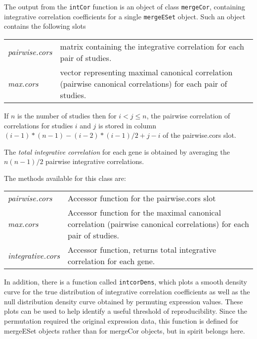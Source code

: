 \documentclass[12pt]{article}
\begin{document}
\begin{description}
The output from the \verb+intCor+ function is an object of class
\verb+mergeCor+, containing integrative correlation coefficients for
a single \verb+mergeESet+ object.   Such an object contains the
following slots

\begin{center}
  \begin{tabular}{|lp{5in}|}
    \hline
    {\it pairwise.cors} & matrix containing the integrative correlation
for each pair of studies. \\
    {\it max.cors} & vector representing maximal canonical correlation (pairwise canonical correlations) for each pair of studies.\\\hline
  \end{tabular}
\end{center}

 If $n$ is the number of studies
 then for $i < j \leq n$, the pairwise correlation of correlations for studies $i$ and $j$ is stored in column $(i-1)*(n-1)-(i-2)*(i-1)/2 + j-i$ of the pairwise.cors slot.

The {\it total integrative correlation} for each gene is obtained by
averaging the $n(n-1)/2$ pairwise integrative correlations.

The methods available for this class are:
\begin{center}
  \begin{tabular}{|lp{5in}|}
    \hline
{\it pairwise.cors} &Accessor function for the pairwise.cors slot \\
{\it max.cors} &Accessor function for the maximal canonical correlation (pairwise canonical correlations) for each pair of studies. \\
{\it integrative.cors} &Accessor function, returns total integrative
correlation  for each gene. \\ \hline

 \end{tabular}
\end{center}

In addition, there is a function called \verb+intcorDens+, which
plots a smooth density curve for the true distribution of
integrative correlation coefficients as well as the null
distribution density curve obtained by permuting expression values.
These plots can be used to help identify a useful threshold of
reproducibility. Since the permutation required the original
expression data, this function is defined for mergeESet objects
rather than for mergeCor objects, but in spirit belongs here.


\end{description}
\end{document}
